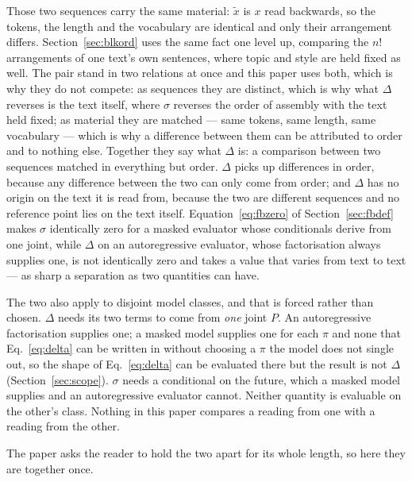 \documentclass[11pt]{article}
\begin{document}
Those two sequences carry the same material: $\tilde{x}$ is $x$ read
backwards, so the tokens, the length and the vocabulary are identical and
only their arrangement differs.  Section~\ref{sec:blkord} uses the same
fact one level up, comparing the $n!$ arrangements of one text's own
sentences, where topic and style are held fixed as well.  The pair stand in
two relations at once and this paper uses both, which is why they do not
compete: as sequences they are distinct, which is why what $\Delta$
reverses is the text itself, where $\sigma$ reverses the order of assembly
with the text held fixed; as
material they are matched --- same tokens, same length, same vocabulary ---
which is why a difference between them can be attributed to order and to
nothing else.  Together they say what $\Delta$ is: a comparison between two
sequences matched in everything but order.  $\Delta$ picks up differences in
order, because any difference between the two can only come from order; and
$\Delta$ has no origin on the text it is read from, because the two are
different sequences and no reference point lies on the text itself.  Equation~\eqref{eq:fbzero} of
Section~\ref{sec:fbdef} makes $\sigma$ identically zero for a masked
evaluator whose conditionals derive from one joint, while $\Delta$ on an
autoregressive evaluator, whose factorisation always supplies one, is not
identically zero and takes a value that varies from text to text --- as
sharp a separation as two quantities can have.

The two also apply to disjoint model classes, and that is forced rather than
chosen.  $\Delta$ needs its two terms to come from \emph{one} joint $P$.  An
autoregressive factorisation supplies one; a masked model supplies one for
each $\pi$ and none that Eq.~\eqref{eq:delta} can be written in without
choosing a $\pi$ the model does not single out, so the shape of
Eq.~\eqref{eq:delta} can be evaluated there but the result is not $\Delta$
(Section~\ref{sec:scope}).  $\sigma$ needs a conditional on the future,
which a masked model supplies and an autoregressive evaluator cannot.  Neither quantity is
evaluable on the other's class.  Nothing in this paper compares a reading
from one with a reading from the other.

The paper asks the reader to hold the two apart for its whole length, so
here they are together once.
\end{document}
